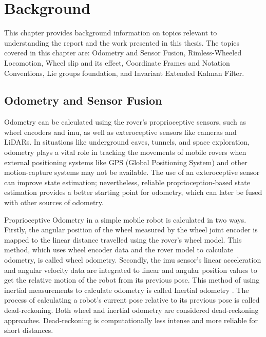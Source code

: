 \documentclass[report.tex]{subfiles}
\begin{document}
\chapter{Background}
\label{chap:background}

This chapter provides background information on topics relevant to understanding the report and the work presented in this thesis. The topics covered in this chapter are: Odometry and Sensor Fusion, Rimless-Wheeled Locomotion, Wheel slip and its effect, Coordinate Frames and Notation Conventions, Lie groups foundation, and Invariant Extended Kalman Filter.

\section{Odometry and Sensor Fusion}
\label{sec:background_odometry_sensor_fusion}

    Odometry can be calculated using the rover's proprioceptive sensors, such as wheel encoders and \gls{imu}, as well as exteroceptive sensors like cameras and LiDARs. In situations like underground caves, tunnels, and space exploration, odometry plays a vital role in tracking the movements of mobile rovers when external positioning systems like GPS (Global Positioning System) and other motion-capture systems may not be available. The use of an exteroceptive sensor can improve state estimation; nevertheless, reliable proprioception-based state estimation provides a better starting point for odometry, which can later be fused with other sources of odometry.

    Proprioceptive Odometry in a simple mobile robot is calculated in two ways. Firstly, the angular position of the wheel measured by the wheel joint encoder is mapped to the linear distance travelled using the rover's wheel model. This method, which uses wheel encoder data and the rover model to calculate odometry, is called wheel odometry. Secondly, the \gls{imu} sensor's linear acceleration and angular velocity data are integrated to linear and angular position values to get the relative motion of the robot from its previous pose. This method of using inertial measurements to calculate odometry is called Inertial odometry \cite{BOOK-Siegwart2011Introduction}. The process of calculating a robot's current pose relative to its previous pose is called dead-reckoning. Both wheel and inertial odometry are considered dead-reckoning approaches. Dead-reckoning is computationally less intense and more reliable for short distances. 
\end{document}
